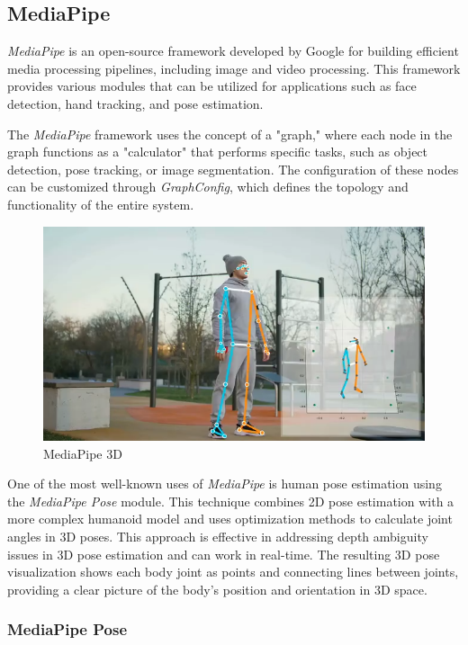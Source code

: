 \subsection{MediaPipe}
\label{subsec:MediaPipe}

\emph{MediaPipe} is an open-source framework developed by Google for building efficient media processing pipelines, including image and video processing. This framework provides various modules that can be utilized for applications such as face detection, hand tracking, and pose estimation.

The \emph{MediaPipe} framework uses the concept of a "graph," where each node in the graph functions as a "calculator" that performs specific tasks, such as object detection, pose tracking, or image segmentation. The configuration of these nodes can be customized through \emph{GraphConfig}, which defines the topology and functionality of the entire system.

\begin{figure}[H]
  \centering
  \includegraphics[scale=0.35]{gambar/MediaPipe3D.png}
  \caption{MediaPipe 3D}
  \label{fig:MediaPipe3D}
\end{figure}

One of the most well-known uses of \emph{MediaPipe} is human pose estimation using the \emph{MediaPipe Pose} module. This technique combines 2D pose estimation with a more complex humanoid model and uses optimization methods to calculate joint angles in 3D poses. This approach is effective in addressing depth ambiguity issues in 3D pose estimation and can work in real-time. The resulting 3D pose visualization shows each body joint as points and connecting lines between joints, providing a clear picture of the body's position and orientation in 3D space.

\subsubsection{MediaPipe Pose}
\label{subsubsec:MediaPipe Pose}

